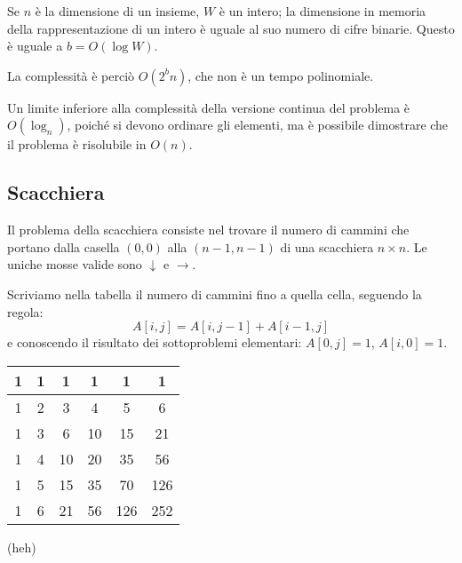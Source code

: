 \documentclass[a4paper,10pt]{article}
\theoremstyle{definition}
\begin{document}
Se $n$ è la dimensione di un insieme, $W$ è un intero; la dimensione in memoria della rappresentazione di un intero è uguale al suo numero di cifre binarie. Questo è uguale a $b = O(\log W)$. \smallskip

La complessità è perciò $O(2^b n)$, che non è un tempo polinomiale.\bigskip

Un limite inferiore alla complessità della versione continua del problema è $O(\log_n)$, poiché si devono ordinare gli elementi, ma è possibile dimostrare che il problema è risolubile in $O(n)$.

\subsection{Scacchiera}
Il problema della scacchiera consiste nel trovare il numero di cammini che portano dalla casella $(0,0)$ alla $(n-1,n-1)$ di una scacchiera $n \times n$. Le uniche mosse valide sono $\downarrow$ e $\rightarrow$.

Scriviamo nella tabella il numero di cammini fino a quella cella, seguendo la regola:
\[A[i, j] = A[i, j-1] + A[i-1, j]\]
e conoscendo il risultato dei sottoproblemi elementari: $A[0, j] = 1$, $A[i, 0] = 1$.
\begin{center}
 
\begin{tabular}{|c|c|c|c|c|c|}
 \hline
 1&1&1&1&1&1\\
 \hline
 1&2&3&4&5&6\\
 \hline
 1&3&6&10&15&21\\
 \hline
 1&4&10&20&35&56\\
 \hline
 1&5&15&35&70&126\\
 \hline
 1&6&21&56&126&252\\
 \hline
\end{tabular}   \bigskip

(heh)

\end{center}
\end{document}
